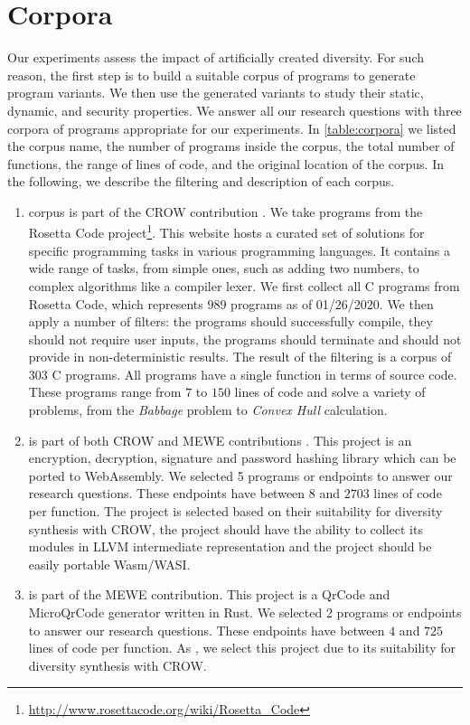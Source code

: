 \section{Corpora}
\label{section:crow:corpora}

Our experiments assess the impact of artificially created diversity. For such reason, the first step is to build a suitable corpus of programs to generate program variants. We then use the generated variants to study their static, dynamic, and security properties.  We answer all our research questions with three corpora of programs appropriate for our experiments. In \autoref{table:corpora} we listed the corpus name, the number of programs inside the corpus, the total number of functions, the range of lines of code, and the original location of the corpus. In the following, we describe the filtering and description of each corpus.

\begin{enumerate}
    \item \textbf{\corpusrosetta} corpus is part of the CROW contribution \cite{}. We take programs from the  Rosetta Code project\footnote{\url{http://www.rosettacode.org/wiki/Rosetta_Code}}. This website hosts a curated set of solutions for specific programming tasks in various  programming languages. It contains a wide range of tasks, from simple ones, such as adding two numbers, to complex algorithms like a compiler lexer.  We first collect all C programs from Rosetta Code, which represents $989$ programs as of 01/26/2020.  We then apply a number of filters: the programs should successfully compile, they should not require user inputs, the programs should terminate and should not provide in non-deterministic results. The result of the filtering is a corpus of 303 C programs. All programs have a single function in terms of source code. These programs range from $7$ to $150$ lines of code and solve a variety of problems, from the \textit{Babbage} problem to  \textit{Convex Hull} calculation.
    \item \textbf{\corpussodium} is part of both CROW and MEWE contributions \cite{} \cite{}. This project is an encryption, decryption, signature and password hashing library which can be ported to WebAssembly.
    We selected 5 programs or endpoints to answer our research questions. These endpoints have between $8$ and $2703$ lines of code per function.  The project is selected based on their suitability for  diversity synthesis with CROW, \ie the project should have the ability to collect its modules in LLVM intermediate representation and the project should be easily portable Wasm/WASI.

    \item \textbf{\corpusqrcode} is part of the MEWE contribution. This project is a QrCode and MicroQrCode generator written in Rust. We selected 2 programs or endpoints to answer our research questions. These endpoints have between $4$ and $725$ lines of code per function. As \corpussodium, we select this project due to its suitability for diversity synthesis with CROW.
\end{enumerate}

